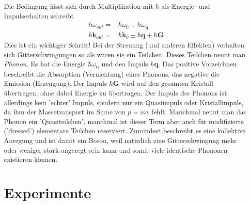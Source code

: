 %

Die Bedingung lässt sich durch Multiplikation mit $\hbar$ als 
 Energie- und Impulserhalten schreibt 
\begin{align}
\hbar \omega_{out} = & \hbar \omega_{0}  \pm \hbar
 \omega_\mathbf{q} \\
\hbar \mathbf{k}_{out} =  &\hbar \mathbf{k}_{0} \pm \hbar 
\mathbf{q}  + \hbar \mathbf{G}
\end{align}
Dies ist ein wichtiger Schritt! Bei der Streuung (und anderen Effekten) verhalten sich Gitterschwingungen so als wären sie ein Teilchen. Dieses Teilchen nennt man \emph{Phonon}. Es hat die Energie $\hbar \omega_\mathbf{q}$ und den Impuls $\hbar \mathbf{q}$. Das positive Vorzeichnen beschreibt die Absorption (Vernichtung) eines Phonons, das negative die Emission (Erzeugung). Der Impuls $\hbar \mathbf{G}$ wird auf den gesamten Kristall übertragen, ohne dabei Energie zu übertragen. Der Impuls des Phonons ist allerdings kein 'echter' Impuls, sondern nur ein Quasiimpuls oder Kristallimpuls, da ihm der Massetransport im Sinne von $p = m v$ fehlt. Manchmal nennt man das Phonon ein 'Quasiteilchen', manchmal ist dieser Term aber auch für modifizierte ('dressed') elementare Teilchen reserviert. Zumindest beschreibt es eine kollektive Anregung und ist damit ein Boson, weil natürlich eine Gitterschwingung mehr oder weniger stark angeregt sein kann und somit viele identische Phononen existieren können.






\section{Experimente}

